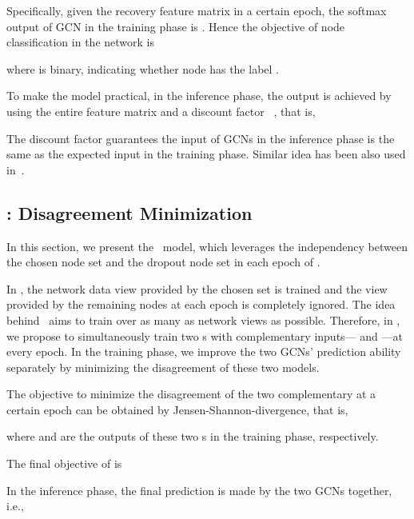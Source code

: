 {{Specifically, given the recovery feature matrix  in a certain epoch, the softmax output of GCN in the training phase is . Hence the  objective of node classification in the network is




\noindent where  is binary, indicating whether node  has the label .  


To make the model practical, in the inference phase, the output is achieved by using the entire feature matrix  and a discount factor ~\cite{srivastava2014dropout}, that is, 



The discount factor guarantees the input of GCNs in the inference phase is the same as the expected input in the training phase. Similar idea has been also used in~\cite{srivastava2014dropout}. 









\subsection{\dm: Disagreement Minimization}In this section, we present the \dm\ model, which leverages the independency between the chosen node set  and the dropout node set  in each epoch of \drop. 


In \drop, the network data view provided by the chosen set  is trained and the view provided by the remaining nodes  at each epoch is completely ignored. 
The idea behind \drop\ aims to train over as many as network views as possible. 
Therefore, in \dm, we propose to simultaneously train two \drop s with complementary inputs--- and ---at every epoch. 
In the  training phase, we improve the two GCNs' prediction ability separately by minimizing the disagreement of these two models. 




The objective to minimize the disagreement of the two complementary \sdrop at a certain epoch can be obtained by Jensen-Shannon-divergence, that is, 



\noindent where  and  are the outputs of these two \drop s in the training phase, respectively. 


The final objective of \sdm is



In the inference phase, the final prediction is made by the two GCNs together, i.e., 



}}
